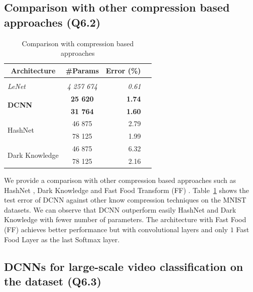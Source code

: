 \subsection{Comparison with other compression based approaches (Q6.2)}


\begin{table}
  \centering
    \caption{Comparison with compression based approaches}
    \begin{tabular}{lcrc}
    \toprule
    \multicolumn{1}{c}{\textbf{Architecture}} & \multicolumn{1}{c}{\textbf{\#Params}} & \textbf{Error (\%)} \\
    \hline \\
    \textit{LeNet \cite{Lecun98gradient-basedlearning}} & \textit{4 257 674} & \textit{0.61} \\
    \multirow{2}[0]{*}{\textbf{DCNN}} & \textbf{25 620} & \textbf{1.74} \\
          & \textbf{31 764} & \textbf{1.60} \\
    \multirow{2}[0]{*}{HashNet \cite{Chen_Hashing_Trick}} & 46 875 & 2.79 \\
          &  78 125 & 1.99 \\
    \multirow{2}[0]{*}{Dark Knowledge \cite{44873}} & 46 875 & 6.32 \\
          &  78 125 & 2.16 \\
    \bottomrule
    \end{tabular}%
  \label{tab:mnist}%
\end{table}%


We provide a comparison with other compression based approaches such as HashNet \cite{Chen_Hashing_Trick}, Dark Knowledge \cite{44873} and Fast Food Transform (FF) \cite{7410530}. 
Table~\ref{tab:mnist} shows the test error of DCNN against other know compression techniques on the MNIST datasets. We can observe that DCNN outperform easily HashNet \cite{Chen_Hashing_Trick} and Dark Knowledge \cite{44873} with fewer number of parameters. The architecture with Fast Food (FF) \cite{7410530} achieves better performance but with convolutional layers and only $1$ Fast Food Layer as the last Softmax layer. 


\subsection{DCNNs for large-scale video classification on the \yt dataset (Q6.3)}

